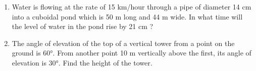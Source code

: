\documentclass[journal,12pt,twocolumn]{IEEEtran}
\renewcommand\thesection{\arabic{section}}
\begin{document}
\begin{enumerate}[label=\thesection.\arabic*.,ref=\thesection.\theenumi]
\item Water is flowing at the rate of 15 km/hour through a pipe of diameter 14 cm into a cuboidal pond which is 50 m long and 44 m wide. In what time will the level of water in the pond rise by 21 cm ?
\item The angle of elevation of the top of a vertical tower from a point on the ground is 60°. From another point 10 m vertically above the first, its angle of elevation is 30°. Find the height of the tower.
\end{enumerate}
\end{document}
